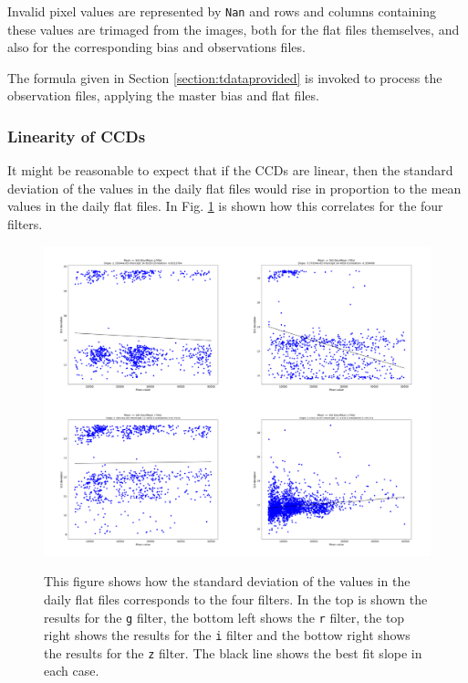 Invalid pixel values are represented by \texttt{Nan} and rows and columns
containing these values are trimaged from the images, both for the flat files
themselves, and also for the corresponding bias and observations files.

The formula given in Section \ref{section:tdataprovided} is invoked to process
the observation files, applying the master bias and flat files.

\subsubsection{Linearity of CCDs}

It might be reasonable to expect that if the CCDs are linear, then the standard
deviation of the values in the daily flat files would rise in proportion to the
mean values in the daily flat files. In Fig. \ref{fig:ffcorr} is shown how this
correlates for the four filters.

\begin{figure}[!htbp]
\begin{center}
\includegraphics[scale=0.25]{images/Corr.png} \\
\end{center}   
\caption{This figure shows how the standard deviation of the values in the
daily flat files corresponds to the four filters. In the top is shown the
results for the \texttt{g} filter, the bottom left shows the \texttt{r} filter,
the top right shows the results for the \texttt{i} filter and the bottow right
shows the results for the \texttt{z} filter. The black line shows the best fit
slope in each case.}
\protect\label{fig:ffcorr}
\end{figure}

